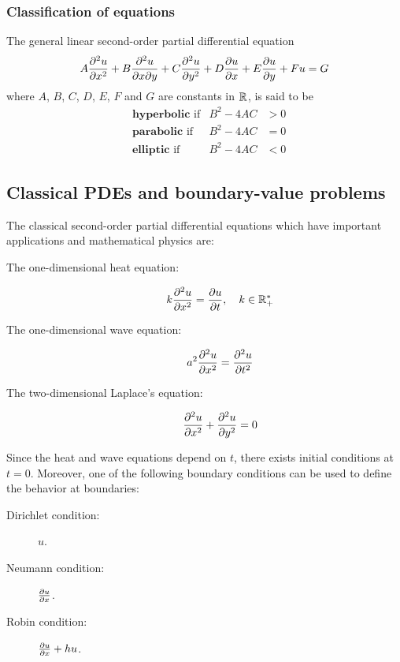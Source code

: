 \documentclass[10pt, twocolumn]{article}
\begin{document}
\subsubsection{Classification of equations}
The general linear second-order partial differential equation
\[
  A\frac{\partial^{2} u}{\partial x^{2}} + B \frac{\partial ^2 u}{\partial x \partial y} + C \frac{\partial^{2} u}{\partial y^{2}} + D \frac{\partial u}{\partial x} + E \frac{\partial u}{\partial y} + F u = G
\]
where \(A\), \(B\), \(C\), \(D\), \(E\), \(F\) and \(G\) are constants in \(\mathbb{R}_{}^{}\), is said to be
\begin{align*}
   & \textbf{hyperbolic} \text{ if} & B^2 - 4AC & > 0 \\
   & \textbf{parabolic} \text{ if}  & B^2 - 4AC & = 0 \\
   & \textbf{elliptic} \text{ if}   & B^2 - 4AC & < 0
\end{align*}


\subsection{Classical PDEs and boundary-value problems}
The classical second-order partial differential equations which have important applications and mathematical physics are:
\begin{description}
  \item[The one-dimensional heat equation:]
        \[
          k \frac{\partial^{2} u}{\partial x^{2}} = \frac{\partial u}{\partial t}, \quad k \in\mathbb{R}_{+}^{*}
        \]
  \item[The one-dimensional wave equation:]
        \[
          a^2 \frac{\partial^{2} u}{\partial x^{2}} = \frac{\partial^{2} u}{\partial t^{2}}
        \]
  \item[The two-dimensional Laplace's equation:]
        \[
          \frac{\partial^{2} u}{\partial x^{2}} + \frac{\partial^{2} u}{\partial y^{2}} = 0
        \]
\end{description}

Since the heat and wave equations depend on \(t\), there exists initial conditions at \(t = 0\). \newline
Moreover, one of the following boundary conditions can be used to define the behavior at boundaries:
\begin{description}
  \item[Dirichlet condition:] \(u\).
  \item[Neumann condition:] \(\frac{\partial u}{\partial x}\).
  \item[Robin condition:] \(\frac{\partial u}{\partial x} + hu\).
\end{description}
\end{document}
